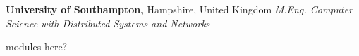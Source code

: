
\smallskip
{}%
\textbf{University of Southampton,} Hampshire, United Kingdom \newline
\emph{M.Eng. Computer Science with Distributed Systems and Networks} 
\begin{itemize*}
  \item modules here?
\end{itemize*}
